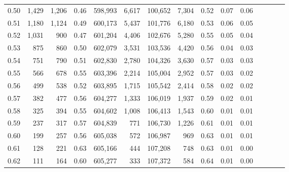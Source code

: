 \begin{tabular}{rrrcrrrrrrrrrrr}
0.50 &   1,429 &  1,206 &                                       0.46 &  598,993 &    6,617 &  100,652 &    7,304 &  0.52 &  0.07 &                         0.06 \\
0.51 &   1,180 &  1,124 &                                       0.49 &  600,173 &    5,437 &  101,776 &    6,180 &  0.53 &  0.06 &                         0.05 \\
0.52 &   1,031 &    900 &                                       0.47 &  601,204 &    4,406 &  102,676 &    5,280 &  0.55 &  0.05 &                         0.04 \\
0.53 &     875 &    860 &                                       0.50 &  602,079 &    3,531 &  103,536 &    4,420 &  0.56 &  0.04 &                         0.03 \\
0.54 &     751 &    790 &                                       0.51 &  602,830 &    2,780 &  104,326 &    3,630 &  0.57 &  0.03 &                         0.03 \\
0.55 &     566 &    678 &                                       0.55 &  603,396 &    2,214 &  105,004 &    2,952 &  0.57 &  0.03 &                         0.02 \\
0.56 &     499 &    538 &                                       0.52 &  603,895 &    1,715 &  105,542 &    2,414 &  0.58 &  0.02 &                         0.02 \\
0.57 &     382 &    477 &                                       0.56 &  604,277 &    1,333 &  106,019 &    1,937 &  0.59 &  0.02 &                         0.01 \\
0.58 &     325 &    394 &                                       0.55 &  604,602 &    1,008 &  106,413 &    1,543 &  0.60 &  0.01 &                         0.01 \\
0.59 &     237 &    317 &                                       0.57 &  604,839 &      771 &  106,730 &    1,226 &  0.61 &  0.01 &                         0.01 \\
0.60 &     199 &    257 &                                       0.56 &  605,038 &      572 &  106,987 &      969 &  0.63 &  0.01 &                         0.01 \\
0.61 &     128 &    221 &                                       0.63 &  605,166 &      444 &  107,208 &      748 &  0.63 &  0.01 &                         0.00 \\
0.62 &     111 &    164 &                                       0.60 &  605,277 &      333 &  107,372 &      584 &  0.64 &  0.01 &                         0.00 \\

\end{tabular}
